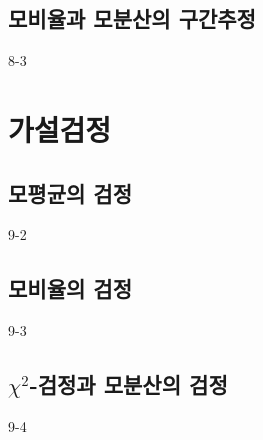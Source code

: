 \subsection{모비율과 모분산의 구간추정}
{8-3}

\newpage
\section{가설검정}
\setcounter{subsection}{1}

\subsection{모평균의 검정}
{9-2}

\newpage
\subsection{모비율의 검정}
{9-3}

\newpage
\subsection{$\chi^2$-검정과 모분산의 검정}
{9-4}

